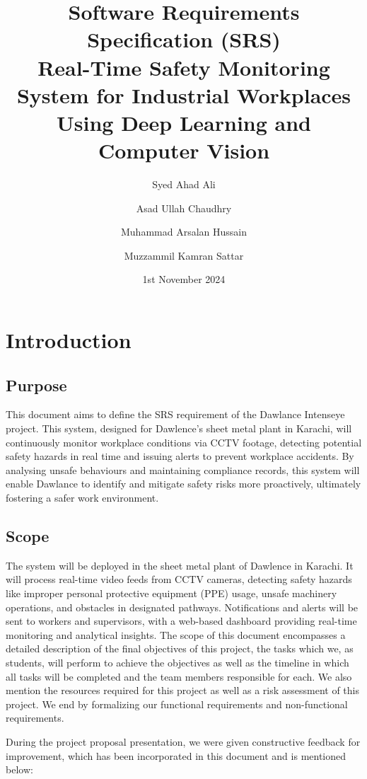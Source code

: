 \documentclass[12pt]{article}
\title{Software Requirements Specification (SRS)\\
\large \textbf{Real-Time Safety Monitoring System for Industrial Workplaces Using Deep Learning and Computer Vision}}
\author{
    Syed Ahad Ali \and Asad Ullah Chaudhry \and Muhammad Arsalan Hussain \and Muzzammil Kamran Sattar
}
\date{1st November 2024}
\begin{document}
\maketitle
\tableofcontents
\newpage





\section{Introduction}

\subsection*{Purpose}
This document aims to define the SRS requirement of the Dawlance Intenseye project. This system, designed for Dawlence’s sheet metal plant in Karachi, will continuously monitor workplace conditions via CCTV footage, detecting potential safety hazards in real time and issuing alerts to prevent workplace accidents. By analysing unsafe behaviours and maintaining compliance records, this system will enable Dawlance to identify and mitigate safety risks more proactively, ultimately fostering a safer work environment.

\subsection*{Scope}
The system will be deployed in the sheet metal plant of Dawlence in Karachi. It will process real-time video feeds from CCTV cameras, detecting safety hazards like improper personal protective equipment (PPE) usage, unsafe machinery operations, and obstacles in designated pathways. Notifications and alerts will be sent to workers and supervisors, with a web-based dashboard providing real-time monitoring and analytical insights. The scope of this document encompasses a detailed description of the final objectives of this project, the tasks which we, as students, will perform to achieve the objectives as well as the timeline in which all tasks will be completed and the team members responsible for each. We also mention the resources required for this project as well as a risk assessment of this project. We end by formalizing our functional requirements and non-functional requirements. 

During the project proposal presentation, we were given constructive feedback for improvement, which has been incorporated in this document and is mentioned below:
\end{document}

